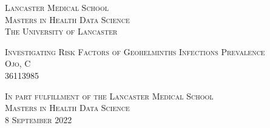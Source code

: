
\begin{titlepage}

        \begin{center}

            \vspace*{1cm}

            \begin{minipage}{0.95\textwidth}

                \begin{center}
                    {\sffamily \small \textsc{Lancaster Medical School\\Masters in Health Data Science\\The University of Lancaster}}
                    \vspace{3.5cm}

                    {\sffamily \Large \textsc{Investigating Risk Factors of Geohelminths Infections Prevalence}\\
                    \small \textsc{Ojo, C\\36113985}}
                    \vspace{11.5cm}

                    {\sffamily \small \textsc{In part fulfillment of the Lancaster Medical School\\ Masters in Health
                    Data Science \\ 8 September 2022}}

                \end{center}

            \end{minipage}

        \end{center}

\end{titlepage}